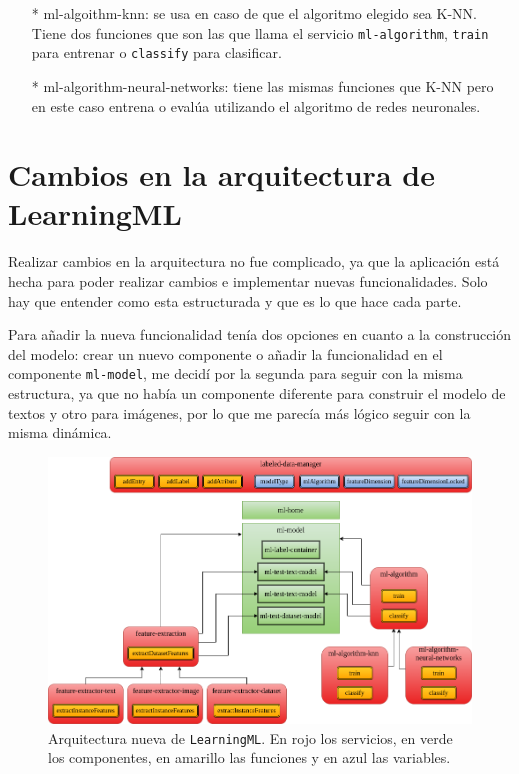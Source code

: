 \documentclass[a4paper, 12pt]{book}
\begin{document}
\begin{itemize}
	\begin{itemize}
		\item[*] ml-algoithm-knn: se usa en caso de que el algoritmo elegido sea K-NN. 
		Tiene dos funciones que son las que llama el servicio \texttt{ml-algorithm}, \texttt{train} para entrenar o \texttt{classify} para clasificar.
		\item[*] ml-algorithm-neural-networks: tiene las mismas funciones que K-NN pero en este caso entrena o evalúa utilizando el algoritmo de redes neuronales.
	\end{itemize}
\end{itemize}

\section{Cambios en la arquitectura de LearningML} 
\label{sec:arquitectura nueva}

Realizar cambios en la arquitectura no fue complicado, ya que la aplicación está hecha para poder realizar cambios e implementar nuevas funcionalidades. 
Solo hay que entender como esta estructurada y que es lo que hace cada parte.

Para añadir la nueva funcionalidad tenía dos opciones en cuanto a la construcción del modelo: crear un nuevo componente o añadir la funcionalidad en el componente \texttt{ml-model}, me decidí por la segunda para seguir con la misma estructura, ya que no había un componente diferente para construir el modelo de textos y otro para imágenes, por lo que me parecía más lógico seguir con la misma dinámica.

\begin{figure}[b!]
	\centering 
	\includegraphics[width=13cm, keepaspectratio]{img/arquitectura_nueva.png}
	\caption{Arquitectura nueva de \texttt{LearningML}. En rojo los servicios, en verde los componentes, en amarillo las funciones y en azul las variables.} \label{fig:arquitectura_nueva}
\end{figure}
\end{document}
